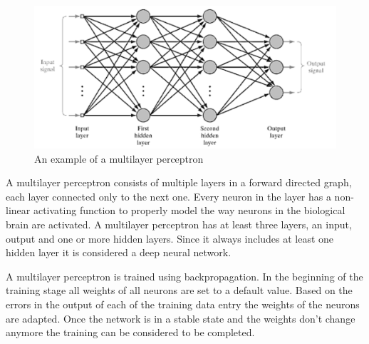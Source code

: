 \begin{figure}[!ht]
	\centering
	\includegraphics[width=1.0\textwidth]{images/multilayer-perceptron}
	\caption{An example of a multilayer perceptron \cite{MultilayerPerceptron}}
	\label{fig:multilayer-perceptron}
\end{figure}

A multilayer perceptron consists of multiple layers in a forward directed graph, each layer connected only to the next one. Every neuron in the layer has a non-linear activating function to properly model the way neurons in the biological brain are activated. A multilayer perceptron has at least three layers, an input, output and one or more hidden layers. Since it always includes at least one hidden layer it is considered a deep neural network.

A multilayer perceptron is trained using backpropagation. In the beginning of the training stage all weights of all neurons are set to a default value. Based on the errors in the output of each of the training data entry the weights of the neurons are adapted. Once the network is in a stable state and the weights don't change anymore the training can be considered to be completed.